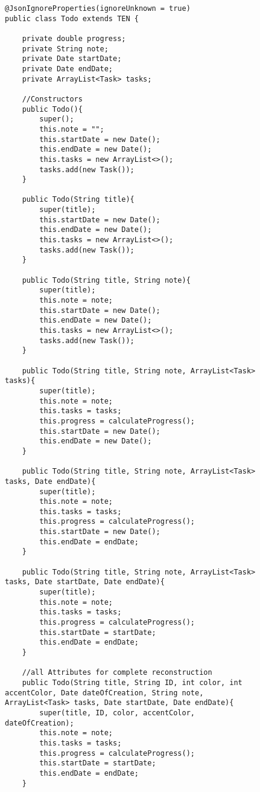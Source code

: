 \begin{figure}[H]
\begin{lstlisting}[caption=Todo (Joscha Nassenstein)]
@JsonIgnoreProperties(ignoreUnknown = true)
public class Todo extends TEN {

    private double progress;
    private String note;
    private Date startDate;
    private Date endDate;
    private ArrayList<Task> tasks;

    //Constructors
    public Todo(){
        super();
        this.note = "";
        this.startDate = new Date();
        this.endDate = new Date();
        this.tasks = new ArrayList<>();
        tasks.add(new Task());
    }

    public Todo(String title){
        super(title);
        this.startDate = new Date();
        this.endDate = new Date();
        this.tasks = new ArrayList<>();
        tasks.add(new Task());
    }

    public Todo(String title, String note){
        super(title);
        this.note = note;
        this.startDate = new Date();
        this.endDate = new Date();
        this.tasks = new ArrayList<>();
        tasks.add(new Task());
    }

    public Todo(String title, String note, ArrayList<Task> tasks){
        super(title);
        this.note = note;
        this.tasks = tasks;
        this.progress = calculateProgress();
        this.startDate = new Date();
        this.endDate = new Date();
    }

    public Todo(String title, String note, ArrayList<Task> tasks, Date endDate){
        super(title);
        this.note = note;
        this.tasks = tasks;
        this.progress = calculateProgress();
        this.startDate = new Date();
        this.endDate = endDate;
    }

    public Todo(String title, String note, ArrayList<Task> tasks, Date startDate, Date endDate){
        super(title);
        this.note = note;
        this.tasks = tasks;
        this.progress = calculateProgress();
        this.startDate = startDate;
        this.endDate = endDate;
    }

    //all Attributes for complete reconstruction
    public Todo(String title, String ID, int color, int accentColor, Date dateOfCreation, String note, ArrayList<Task> tasks, Date startDate, Date endDate){
        super(title, ID, color, accentColor, dateOfCreation);
        this.note = note;
        this.tasks = tasks;
        this.progress = calculateProgress();
        this.startDate = startDate;
        this.endDate = endDate;
    }


\end{lstlisting}
\end{figure}
